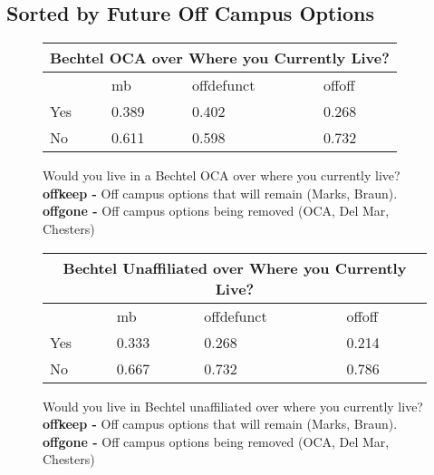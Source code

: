 \documentclass[12pt]{article} %
\begin{document}
\subsection{Sorted by Future Off Campus Options}
\vspace{-5mm}
\begin{figure}[H]
	\vspace{-13mm}
\begin{center}
\begin{tabular}{|m{1.3 cm}|m{2.3 cm}|m{2.3 cm}|m{2.3 cm} |}
\hline
\multicolumn{4}{|c|}{Bechtel OCA over Where you Currently Live?}\\ \hline
& mb& offdefunct& offoff\\ \hline
Yes   &  0.389 &  0.402 &  0.268\\ \hline
No   &  0.611 &  0.598 &  0.732\\ \hline
\end{tabular}
\end{center}
	\caption{Would you live in a Bechtel OCA over where you currently live?
	\newline \textbf{offkeep - } Off campus options that will remain (Marks, Braun). 	
	\newline\textbf{offgone - } Off campus options being removed (OCA, Del Mar, Chesters)}
\end{figure}

\vspace{-5mm}

\begin{figure}[H]
	\vspace{-13mm}
\begin{center}
\begin{tabular}{|m{1.3 cm}|m{2.3 cm}|m{2.3 cm}|m{2.3 cm} |}
\hline
\multicolumn{4}{|c|}{Bechtel Unaffiliated over Where you Currently Live?}\\ \hline
& mb& offdefunct& offoff\\ \hline
Yes   &  0.333 &  0.268 &  0.214\\ \hline
No   &  0.667 &  0.732 &  0.786\\ \hline
\end{tabular}
\end{center}
	\caption{Would you live in Bechtel unaffiliated over where you currently live?
	\newline \textbf{offkeep - } Off campus options that will remain (Marks, Braun). 	
	\newline\textbf{offgone - } Off campus options being removed (OCA, Del Mar, Chesters)}
\end{figure}
\newpage
\end{document}
